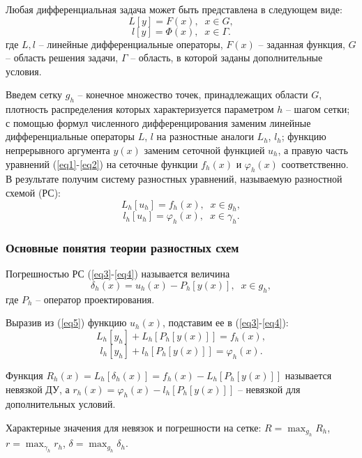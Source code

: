 \documentclass[
11pt,
master, %
subf, %
href, %
colorlinks=true, %
times, %
]{disser}
\begin{document}
Любая дифференциальная задача может быть представлена в следующем виде:
\begin{equation}\label{eq1}
  L[y] = F(x),\;\; x\in G,
\end{equation}
\begin{equation}\label{eq2}
  l[y] = \Phi(x),\;\; x\in \Gamma.
\end{equation}
где $L, l$ -- линейные дифференциальные операторы, $F(x)$ -- заданная функция, $G$ -- область решения задачи, $\Gamma$ -- область, в которой заданы дополнительные условия.

Введем сетку $g_h$ -- конечное множество точек, принадлежащих области $G$, плотность распределения которых характеризуется параметром $h$ -- шагом сетки; с помощью формул численного дифференцирования заменим линейные дифференциальные операторы $L$, $l$ на разностные аналоги $L_h$, $l_h$; функцию непрерывного аргумента $y(x)$ заменим сеточной функцией $u_h$, а правую часть уравнений (\ref{eq1}-\ref{eq2}) на сеточные функции $f_h(x)$ и $\varphi_h(x)$ соответственно. В результате получим систему разностных уравнений, называемую разностной схемой (РС):
\begin{equation}\label{eq3}
  L_h[u_h] = f_h(x),\;\; x\in g_h,
\end{equation}
\begin{equation}\label{eq4}
  l_h[u_h] = \varphi_h(x),\;\; x\in \gamma_h.
\end{equation}

\subsubsection{Основные понятия теории разностных схем}

Погрешностью РС (\ref{eq3}-\ref{eq4}) называется величина
\begin{equation}\label{eq5}
  \delta_h(x) = u_h(x) - P_h[y(x)],\;\;x\in g_h,
\end{equation}
где $P_h$ -- оператор проектирования.

Выразив из (\ref{eq5}) функцию $u_h(x)$, подставим ее в (\ref{eq3}-\ref{eq4}):
$$L_h[y_h] + L_h[P_h[y(x)]] = f_h(x),$$
$$l_h[y_h] + l_h[P_h[y(x)]] = \varphi_h(x).$$

Функция $\displaystyle R_h(x) = L_h[\delta_h(x)] = f_h(x) - L_h[P_h[y(x)]]$ называется невязкой ДУ, а $\displaystyle r_h(x) = \varphi_h(x) - l_h[P_h[y(x)]]$ -- невязкой для дополнительных условий.

Характерные значения для невязок и погрешности на сетке: $R = \max_{g_h} R_h$, $r = \max_{\gamma_h} r_h$, $\delta = \max_{g_h} \delta_h$.
\end{document}
